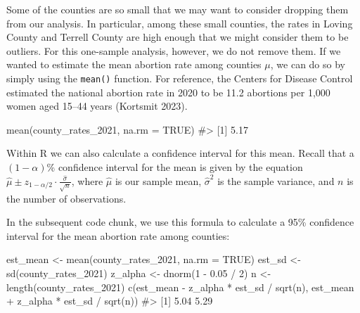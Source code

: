 \documentclass[
  letterpaper,
]{latex/krantz}
\makeatletter
\newenvironment{Shaded}{\begin{snugshade}}{\end{snugshade}}
\newcommand{\AttributeTok}[1]{\textcolor[rgb]{0.40,0.45,0.13}{#1}}
\newcommand{\CommentTok}[1]{\textcolor[rgb]{0.37,0.37,0.37}{#1}}
\newcommand{\ConstantTok}[1]{\textcolor[rgb]{0.56,0.35,0.01}{#1}}
\newcommand{\DecValTok}[1]{\textcolor[rgb]{0.68,0.00,0.00}{#1}}
\newcommand{\FloatTok}[1]{\textcolor[rgb]{0.68,0.00,0.00}{#1}}
\newcommand{\FunctionTok}[1]{\textcolor[rgb]{0.28,0.35,0.67}{#1}}
\newcommand{\NormalTok}[1]{\textcolor[rgb]{0.00,0.23,0.31}{#1}}
\newcommand{\OtherTok}[1]{\textcolor[rgb]{0.00,0.23,0.31}{#1}}
\newcommand{\SpecialCharTok}[1]{\textcolor[rgb]{0.37,0.37,0.37}{#1}}
\newenvironment{kframe}{%
\medskip{}
\setlength{\fboxsep}{.8em}
 \def\at@end@of@kframe{}%
 \ifinner\ifhmode%
  \def\at@end@of@kframe{\end{minipage}}%
  \begin{minipage}{\columnwidth}%
 \fi\fi%
 \def\FrameCommand##1{\hskip\@totalleftmargin \hskip-\fboxsep
 \colorbox{shadecolor}{##1}\hskip-\fboxsep
     \hskip-\linewidth \hskip-\@totalleftmargin \hskip\columnwidth}%
 \MakeFramed {\advance\hsize-\width
   \@totalleftmargin\z@ \linewidth\hsize
   \@setminipage}}%
 {\par\unskip\endMakeFramed%
 \at@end@of@kframe}
\renewenvironment{Shaded}{\begin{kframe}}{\end{kframe}}
\makeatother
\begin{document}
Some of the counties are so small that we may want to consider dropping
them from our analysis. In particular, among these small counties, the
rates in Loving County and Terrell County are high enough that we might
consider them to be outliers. For this one-sample analysis, however, we
do not remove them. If we wanted to estimate the mean abortion rate
among counties \(\mu\), we can do so by simply using the \texttt{mean()}
function. For reference, the Centers for Disease Control estimated the
national abortion rate in 2020 to be 11.2 abortions per 1,000 women aged
15--44 years (Kortsmit 2023).

\begin{Shaded}
\begin{Highlighting}[]
\FunctionTok{mean}\NormalTok{(county\_rates\_2021, }\AttributeTok{na.rm =} \ConstantTok{TRUE}\NormalTok{)}
\CommentTok{\#\textgreater{} [1] 5.17}
\end{Highlighting}
\end{Shaded}

Within R we can also calculate a confidence interval for this mean.
Recall that a \((1-\alpha)\)\% confidence interval for the mean is given
by the equation
\(\hat{\mu} \pm z_{1-\alpha/2} \cdot \frac{\hat{\sigma}}{\sqrt{n}}\),
where \(\hat{\mu}\) is our sample mean, \(\hat{\sigma}^2\) is the sample
variance, and \(n\) is the number of observations.

In the subsequent code chunk, we use this formula to calculate a 95\%
confidence interval for the mean abortion rate among counties:

\begin{Shaded}
\begin{Highlighting}[]
\NormalTok{est\_mean }\OtherTok{\textless{}{-}} \FunctionTok{mean}\NormalTok{(county\_rates\_2021, }\AttributeTok{na.rm =} \ConstantTok{TRUE}\NormalTok{)}
\NormalTok{est\_sd }\OtherTok{\textless{}{-}} \FunctionTok{sd}\NormalTok{(county\_rates\_2021)}
\NormalTok{z\_alpha }\OtherTok{\textless{}{-}} \FunctionTok{dnorm}\NormalTok{(}\DecValTok{1} \SpecialCharTok{{-}} \FloatTok{0.05} \SpecialCharTok{/} \DecValTok{2}\NormalTok{)}
\NormalTok{n }\OtherTok{\textless{}{-}} \FunctionTok{length}\NormalTok{(county\_rates\_2021)}
\FunctionTok{c}\NormalTok{(est\_mean }\SpecialCharTok{{-}}\NormalTok{ z\_alpha }\SpecialCharTok{*}\NormalTok{ est\_sd }\SpecialCharTok{/} \FunctionTok{sqrt}\NormalTok{(n), }
\NormalTok{  est\_mean }\SpecialCharTok{+}\NormalTok{ z\_alpha }\SpecialCharTok{*}\NormalTok{ est\_sd }\SpecialCharTok{/} \FunctionTok{sqrt}\NormalTok{(n))}
\CommentTok{\#\textgreater{} [1] 5.04 5.29}
\end{Highlighting}
\end{Shaded}
\end{document}

